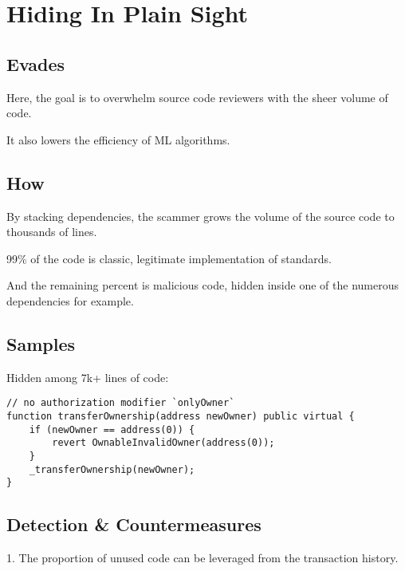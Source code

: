 \section{Hiding In Plain Sight}

\subsection{Evades}

Here, the goal is to overwhelm source code reviewers with the sheer volume of code.

It also lowers the efficiency of ML algorithms.

\subsection{How}

By stacking dependencies, the scammer grows the volume of the source code to thousands of lines.

99\% of the code is classic, legitimate implementation of standards.

And the remaining percent is malicious code, hidden inside one of the numerous dependencies for example.

\subsection{Samples}

Hidden among 7k+ lines of code:

\begin{lstlisting}
// no authorization modifier `onlyOwner`
function transferOwnership(address newOwner) public virtual {
    if (newOwner == address(0)) {
        revert OwnableInvalidOwner(address(0));
    }
    _transferOwnership(newOwner);
}
\end{lstlisting}

\subsection{Detection \& Countermeasures}

1. The proportion of unused code can be leveraged from the transaction history.
